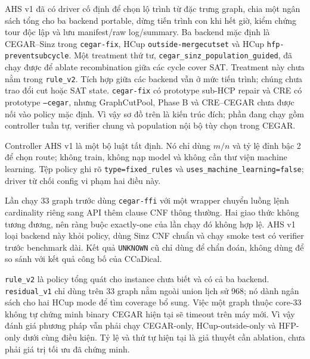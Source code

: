 \documentclass[11pt,a4paper,oneside]{scrreprt}
\newcommand{\code}[1]{\texttt{#1}}
\begin{document}
\clearpage
\begin{warningbox}
AHS v1 đã có driver cố định để chọn lộ trình từ đặc trưng graph, chia một ngân sách tổng cho ba backend portable, dừng tiến trình con khi hết giờ, kiểm chứng tour độc lập và lưu manifest/raw log/summary. Ba backend mặc định là CEGAR--Sinz trong \code{cegar-fix}, HCup \code{outside-mergecutset} và HCup \code{hfp-preventsubcycle}. Một treatment thứ tư, \code{cegar\_sinz\_population\_guided}, đã chạy được để ablate recombination giữa các cycle cover SAT. Treatment này chưa nằm trong \code{rule\_v2}. Tích hợp giữa các backend vẫn ở mức tiến trình; chúng chưa trao đổi cut hoặc SAT state. \code{cegar-fix} có prototype sub-HCP repair và CRE có prototype \code{--cegar}, nhưng GraphCutPool, Phase B và CRE--CEGAR chưa được nối vào policy mặc định. Vì vậy sơ đồ trên là kiến trúc đích; phần đang chạy gồm controller tuần tự, verifier chung và population nội bộ tùy chọn trong CEGAR.
\end{warningbox}

\begin{resultbox}
Controller AHS v1 là một bộ luật tất định. Nó chỉ dùng $m/n$ và tỷ lệ đỉnh bậc 2 để chọn route; không train, không nạp model và không cần thư viện machine learning. Tệp policy ghi rõ \code{type=fixed\_rules} và \code{uses\_machine\_learning=false}; driver từ chối config vi phạm hai điều này.
\end{resultbox}

\begin{warningbox}
Lần chạy 33 graph trước dùng \code{cegar-ffi} với một wrapper chuyển luồng lệnh cardinality riêng sang API thêm clause CNF thông thường. Hai giao thức không tương đương, nên ràng buộc exactly-one của lần chạy đó không hợp lệ. AHS v1 loại backend này khỏi policy, dùng Sinz CNF chuẩn và chạy smoke test có verifier trước benchmark dài. Kết quả \code{UNKNOWN} cũ chỉ dùng để chẩn đoán, không dùng để so sánh với kết quả công bố của CCaDical.
\end{warningbox}

\begin{resultbox}
\code{rule\_v2} là policy tổng quát cho instance chưa biết và có cả ba backend. \code{residual\_v1} chỉ dùng trên 33 graph nằm ngoài union lịch sử 968; nó dành ngân sách cho hai HCup mode để tìm coverage bổ sung. Việc một graph thuộc core-33 không tự chứng minh binary CEGAR hiện tại sẽ timeout trên máy mới. Vì vậy đánh giá phương pháp vẫn phải chạy CEGAR-only, HCup-outside-only và HFP-only dưới cùng điều kiện. Tỷ lệ và thứ tự hiện tại là giả thuyết cần ablation, chưa phải giá trị tối ưu đã chứng minh.
\end{resultbox}
\end{document}

